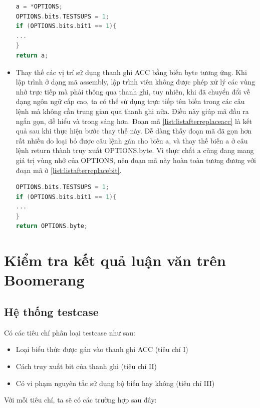 \begin{itemize}
\begin{lstlisting}[caption={Mã đầu ra sau khi thực hiện bước thay thế truy xuất đặc biệt đến bit của thanh ghi ACC},label={list:listafterreplacebit}, language = c]
a = *OPTIONS;
OPTIONS.bits.TESTSUPS = 1;
if (OPTIONS.bits.bit1 == 1){
...
}
return a;
\end{lstlisting}
\item Thay thế các vị trí sử dụng thanh ghi ACC bằng biến byte tương ứng. Khi lập trình ở dạng mã assembly, lập trình viên không được phép xử lý các vùng nhớ trực tiếp mà phải thông qua thanh ghi, tuy nhiên, khi đã chuyển đổi về dạng ngôn ngữ cấp cao, ta có thể sử dụng trực tiếp tên biến trong các câu lệnh mà không cần trung gian qua thanh ghi nữa. Điều này giúp mã đầu ra ngắn gọn, dễ hiểu và trong sáng hơn. Đoạn mã \ref{list:listafterreplaceacc} là kết quả sau khi thực hiện bước thay thế này. Dễ dàng thấy đoạn mã đã gọn hơn rất nhiều do loại bỏ được câu lệnh gán cho biến a, và thay thế biến a ở câu lệnh return thành truy xuất OPTIONS.byte. Vì thực chất a cũng đang mang giá trị vùng nhớ của OPTIONS, nên đoạn mã này hoàn toàn tương đương với đoạn mã ở \ref{list:listafterreplacebit}.

\begin{lstlisting}[caption={Mã đầu ra sau khi thực hiện bước thay thế thanh ghi ACC},label={list:listafterreplaceacc}, language = c]
OPTIONS.bits.TESTSUPS = 1;
if (OPTIONS.bits.bit1 == 1){
...
}
return OPTIONS.byte;
\end{lstlisting}
\end{itemize}


\section{Kiểm tra kết quả luận văn trên Boomerang}

\subsection{Hệ thống testcase}
Có các tiêu chí phân loại testcase như sau:
\begin{itemize}
	\item Loại biểu thức được gán vào thanh ghi ACC (tiêu chí I)
	\item Cách truy xuất bit của thanh ghi (tiêu chí II)
	\item Có vi phạm nguyên tắc sử dụng bộ biến hay không (tiêu chí III)
\end{itemize}
Với mỗi tiêu chí, ta sẽ có các trường hợp sau đây:

